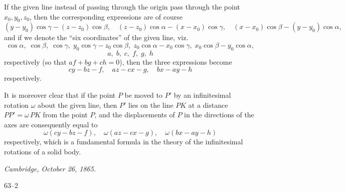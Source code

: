 \documentclass[11pt]{article}
\begin{document}
If the given line instead of passing through the origin pass through the point $x_{0}, y_{0}, z_{0}$, then the corresponding expressions are of course
\[
(y - y_{0})\cos\gamma - (z - z_{0})\cos\beta,\quad (z - z_{0})\cos\alpha - (x - x_{0})\cos\gamma,\quad (x - x_{0})\cos\beta - (y - y_{0})\cos\alpha,
\]
and if we denote the ``six coordinates'' of the given line, viz.\
\[
\cos\alpha,\; \cos\beta,\; \cos\gamma,\; y_{0}\cos\gamma - z_{0}\cos\beta,\; z_{0}\cos\alpha - x_{0}\cos\gamma,\; x_{0}\cos\beta - y_{0}\cos\alpha,
\]
\[
a,\; b,\; c,\; f,\; g,\; h
\]
respectively (so that $af + bg + ch = 0$), then the three expressions become
\[
cy - bz - f,\quad az - cx - g,\quad bx - ay - h
\]
respectively.

It is moreover clear that if the point $P$ be moved to $P'$ by an infinitesimal rotation $\omega$ about the given line, then $P'$ lies on the line $PK$ at a distance $PP' = \omega\, PK$ from the point $P$, and the displacements of $P$ in the directions of the axes are consequently equal to
\[
\omega(cy - bz - f),\quad \omega(az - cx - g),\quad \omega(bx - ay - h)
\]
respectively, which is a fundamental formula in the theory of the infinitesimal rotations of a solid body.

\medskip
\noindent\textit{Cambridge, October 26, 1865.}

\hfill 63--2
\end{document}
